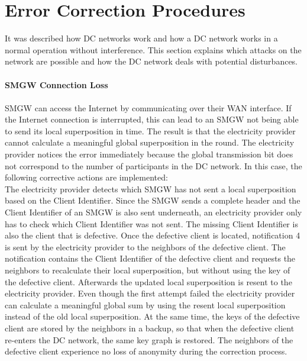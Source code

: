 \section{Error Correction Procedures}
\label{error_corr}
It was described how DC networks work and how a DC network works in a normal operation without interference. This section explains which attacks on the network are possible and how the DC network deals with potential disturbances.
\\
\\
\textbf{SMGW Connection Loss}
\label{error_corr_conn}
\\
\\
\gls{SMGW} can access the Internet by communicating over their \gls{WAN} interface. If the Internet connection is interrupted, this can lead to an \gls{SMGW} not being able to send its local superposition in time. The result is that the electricity provider cannot calculate a meaningful global superposition in the round. The electricity provider notices the error immediately because the global transmission bit does not correspond to the number of participants in the DC network. In this case, the following corrective actions are implemented:\\ %
The electricity provider detects which \gls{SMGW} has not sent a local superposition based on the Client Identifier. Since the \gls{SMGW} sends a complete header and the Client Identifier of an \gls{SMGW} is also sent underneath, an electricity provider only has to check which Client Identifier was not sent. The missing Client Identifier is also the client that is defective. Once the defective client is located, notification 4 is sent by the electricity provider to the neighbors of the defective client. The notification contains the Client Identifier of the defective client and requests the neighbors to recalculate their local superposition, but without using the key of the defective client. Afterwards the updated local superposition is resent to the electricity provider. Even though the first attempt failed the electricity provider can calculate a meaningful global sum by using the resent local superposition instead of the old local superposition. At the same time, the keys of the defective client are stored by the neighbors in a backup, so that when the defective client re-enters the DC network, the same key graph is restored. The neighbors of the defective client experience no loss of anonymity during the correction process.\\%
